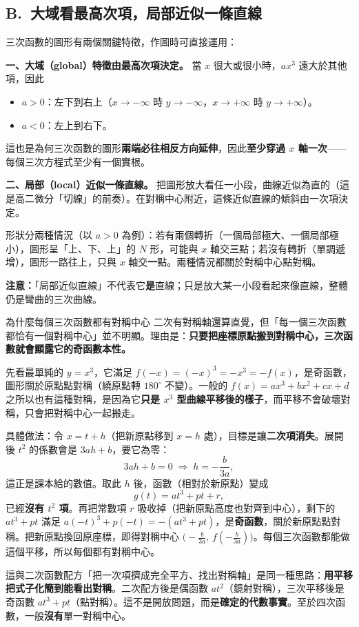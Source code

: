 \documentclass[11pt]{article}
\begin{document}

\subsection*{\sffamily B.\ 大域看最高次項，局部近似一條直線}

三次函數的圖形有兩個關鍵特徵，作圖時可直接運用：

\textbf{一、大域（global）特徵由最高次項決定。} 當 $x$ 很大或很小時，$ax^3$ 遠大於其他項，因此
\begin{itemize}\setlength{\itemsep}{1pt}
\item $a>0$：左下到右上（$x\to-\infty$ 時 $y\to-\infty$，$x\to+\infty$ 時 $y\to+\infty$）。
\item $a<0$：左上到右下。
\end{itemize}
這也是為何三次函數的圖形\textbf{兩端必往相反方向延伸}，因此\textbf{至少穿過 $x$ 軸一次}——每個三次方程式至少有一個實根。

\textbf{二、局部（local）近似一條直線。} 把圖形放大看任一小段，曲線近似為直的（這是高二微分「切線」的前奏）。在對稱中心附近，這條近似直線的傾斜由一次項決定。

\medskip
形狀分兩種情況（以 $a>0$ 為例）：若有兩個轉折（一個局部極大、一個局部極小），圖形呈「上、下、上」的 $N$ 形，可能與 $x$ 軸交\textbf{三}點；若沒有轉折（單調遞增），圖形一路往上，只與 $x$ 軸交\textbf{一}點。兩種情況都關於對稱中心點對稱。

\textbf{注意：}「局部近似直線」不代表它\textbf{是}直線；只是放大某一小段看起來像直線，整體仍是彎曲的三次曲線。

\begin{延伸框}{為什麼每個三次函數都有對稱中心}
二次有對稱軸還算直覺，但「每一個三次函數都恰有一個對稱中心」並不明顯。理由是：\textbf{只要把座標原點搬到對稱中心，三次函數就會顯露它的奇函數本性。}

先看最單純的 $y=x^3$，它滿足 $f(-x)=(-x)^3=-x^3=-f(x)$，是奇函數，圖形關於原點點對稱（繞原點轉 $180^\circ$ 不變）。一般的 $f(x)=ax^3+bx^2+cx+d$ 之所以也有這種對稱，是因為它\textbf{只是 $x^3$ 型曲線平移後的樣子}，而平移不會破壞對稱，只會把對稱中心一起搬走。

具體做法：令 $x=t+h$（把新原點移到 $x=h$ 處），目標是讓\textbf{二次項消失}。展開後 $t^2$ 的係數會是 $3ah+b$，要它為零：
$$3ah+b=0 \;\Rightarrow\; h=-\frac{b}{3a},$$
這正是課本給的數值。取此 $h$ 後，函數（相對於新原點）變成
$$g(t)=a t^3 + p t + r,$$
已經\textbf{沒有 $t^2$ 項}。再把常數項 $r$ 吸收掉（把新原點高度也對齊到中心），剩下的 $at^3+pt$ 滿足 $a(-t)^3+p(-t)=-(at^3+pt)$，是\textbf{奇函數}，關於新原點點對稱。把新原點換回原座標，即得對稱中心 $\big(-\tfrac{b}{3a},\,f(-\tfrac{b}{3a})\big)$。每個三次函數都能做這個平移，所以每個都有對稱中心。

這與二次函數配方「把一次項擠成完全平方、找出對稱軸」是同一種思路：\textbf{用平移把式子化簡到能看出對稱}。二次配方後是偶函數 $at^2$（鏡射對稱），三次平移後是奇函數 $at^3+pt$（點對稱）。這不是開放問題，而是\textbf{確定的代數事實}。至於四次函數，一般\textbf{沒有}單一對稱中心。
\end{延伸框}
\end{document}
